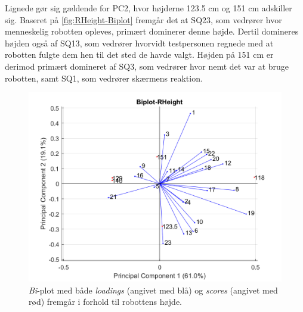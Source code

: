 Lignede gør sig gældende for PC2, hvor højderne 123.5 cm og 151 cm adskiller sig. Baseret på \autoref{fig:RHeight-Biplot} fremgår det at SQ23, som vedrører hvor menneskelig robotten opleves, primært dominerer denne højde. Dertil domineres højden også af SQ13, som vedrører hvorvidt testpersonen regnede med at robotten fulgte dem hen til det sted de havde valgt. Højden på 151 cm er derimod primært domineret af SQ3, som vedrører hvor nemt det var at bruge robotten, samt SQ1, som vedrører skærmens reaktion. 
%
\begin{figure}[H]
\centering
\includegraphics[width=\textwidth]{Figure/DatabehandlingSkalaer/PCAfigures/RHeight-Biplot.png}
\caption{\textit{Bi}-plot med både \textit{loadings} (angivet med blå) og \textit{scores} (angivet med rød) fremgår i forhold til robottens højde.}
\label{fig:RHeight-Biplot}
\end{figure}
\noindent
%
